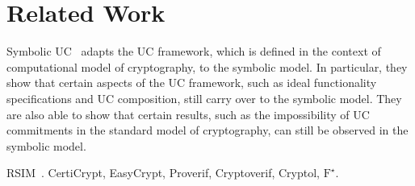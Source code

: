 \section{Related Work}
\label{sec:related}



Symbolic UC~\cite{bohl2016symbolic} adapts the UC framework, which is defined in
the context of computational model of cryptography, to the symbolic model. In
particular, they show that certain aspects of the UC framework, such as ideal
functionality specifications and UC composition, still carry over to the
symbolic model. They are also able to show that certain results, such as the
impossibility of UC commitments in the standard model of cryptography, can still
be observed in the symbolic model.

%

RSIM~\cite{backes2007reactive}. CertiCrypt, EasyCrypt, Proverif, Cryptoverif,
Cryptol, $\text{F}^{\star}$.
